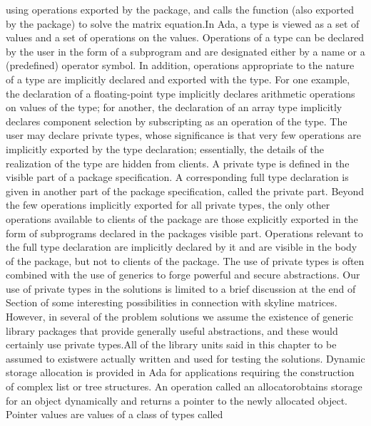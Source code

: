 using operations exported by the package, and calls the function (also
exported by the package) to solve the matrix equation.\Endpara[]
\Para[]In Ada, a type is viewed as a set of values and a set of operations
on the values. Operations of a type can be declared by the user in
the form of a subprogram and are designated either by a name or a
(predefined) operator symbol. In addition, operations appropriate
to the nature of a type are implicitly declared and exported with
the type. For one example, the declaration of a floating-point type
implicitly declares arithmetic operations on values of the type; for
another, the declaration of an array type implicitly declares component
selection by subscripting as an operation of the type. The user may
declare \txtxemph[]private types\txtxendemph[], whose significance
is that very few operations are implicitly exported by the type declaration;
essentially, the details of the realization of the type are hidden
from clients. A private type is defined in the visible part of a package
specification. A corresponding \txtxemph[]full type declaration%
\txtxendemph[] is given in another part of the package specification,
called the \txtxemph[]private part\txtxendemph[]. Beyond the few operations
implicitly exported for all private types, the only other operations
available to clients of the package are those explicitly exported
in the form of subprograms declared in the package\rsquo[]s visible
part. Operations relevant to the full type declaration are implicitly
declared by it and are visible in the body of the package, but not
to clients of the package. The use of private types is often combined
with the use of generics to forge powerful and secure abstractions.
Our use of private types in the solutions is limited to a brief discussion
at the end of Section  of some
interesting possibilities in connection with skyline matrices. However,
in several of the problem solutions we assume the existence of generic
library packages that provide generally useful abstractions, and these
would certainly use private types.\NtFoot[]\NtNtpar[]All of the library
units said in this chapter to be \ldquo[]assumed to exist\rdquo[]
were actually written and used for testing the solutions.%
\NtEndntpar[]\NtEndfoot[]\Endpara[]
\Para[]Dynamic storage allocation is provided in Ada for applications
requiring the construction of complex list or tree structures. An
operation called an \txtxemph[]allocator\txtxendemph[] obtains storage
for an object dynamically and returns a pointer to the newly allocated
object. Pointer values are values of a class of types called %
